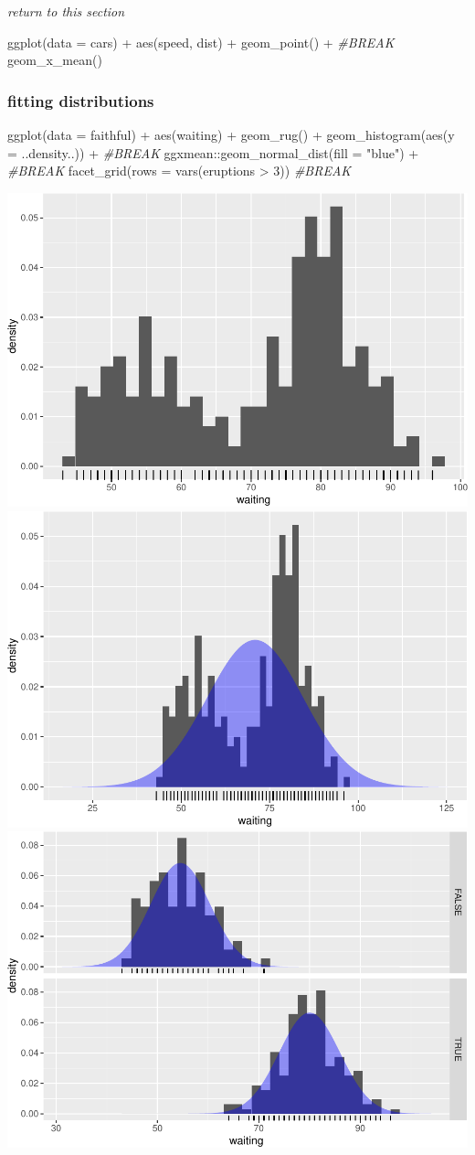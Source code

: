 \documentclass[12pt]{article}
\newenvironment{Shaded}{\begin{snugshade}}{\end{snugshade}}
\newcommand{\AttributeTok}[1]{\textcolor[rgb]{0.77,0.63,0.00}{#1}}
\newcommand{\CommentTok}[1]{\textcolor[rgb]{0.56,0.35,0.01}{\textit{#1}}}
\newcommand{\DecValTok}[1]{\textcolor[rgb]{0.00,0.00,0.81}{#1}}
\newcommand{\FunctionTok}[1]{\textcolor[rgb]{0.00,0.00,0.00}{#1}}
\newcommand{\NormalTok}[1]{#1}
\newcommand{\SpecialCharTok}[1]{\textcolor[rgb]{0.00,0.00,0.00}{#1}}
\newcommand{\StringTok}[1]{\textcolor[rgb]{0.31,0.60,0.02}{#1}}
\begin{document}
\emph{return to this section}

\begin{Shaded}
\begin{Highlighting}[]
\FunctionTok{ggplot}\NormalTok{(}\AttributeTok{data =}\NormalTok{ cars) }\SpecialCharTok{+} 
  \FunctionTok{aes}\NormalTok{(speed, dist) }\SpecialCharTok{+} 
  \FunctionTok{geom\_point}\NormalTok{() }\SpecialCharTok{+} \CommentTok{\#BREAK}
  \FunctionTok{geom\_x\_mean}\NormalTok{()}
\end{Highlighting}
\end{Shaded}

\hypertarget{fitting-distributions}{%
\subsubsection{fitting distributions}\label{fitting-distributions}}

\begin{Shaded}
\begin{Highlighting}[]
\FunctionTok{ggplot}\NormalTok{(}\AttributeTok{data =}\NormalTok{ faithful) }\SpecialCharTok{+} 
  \FunctionTok{aes}\NormalTok{(waiting) }\SpecialCharTok{+} 
  \FunctionTok{geom\_rug}\NormalTok{() }\SpecialCharTok{+} 
  \FunctionTok{geom\_histogram}\NormalTok{(}\FunctionTok{aes}\NormalTok{(}\AttributeTok{y =}\NormalTok{ ..density..)) }\SpecialCharTok{+} \CommentTok{\#BREAK}
\NormalTok{  ggxmean}\SpecialCharTok{::}\FunctionTok{geom\_normal\_dist}\NormalTok{(}\AttributeTok{fill =} \StringTok{"blue"}\NormalTok{) }\SpecialCharTok{+} \CommentTok{\#BREAK}
  \FunctionTok{facet\_grid}\NormalTok{(}\AttributeTok{rows =} \FunctionTok{vars}\NormalTok{(eruptions }\SpecialCharTok{\textgreater{}} \DecValTok{3}\NormalTok{)) }\CommentTok{\#BREAK}
\end{Highlighting}
\end{Shaded}

\begin{center}\includegraphics[width=0.3\linewidth]{manuscript_files/figure-latex/unnamed-chunk-8-1} \includegraphics[width=0.3\linewidth]{manuscript_files/figure-latex/unnamed-chunk-8-2} \includegraphics[width=0.3\linewidth]{manuscript_files/figure-latex/unnamed-chunk-8-3} \end{center}
\end{document}
